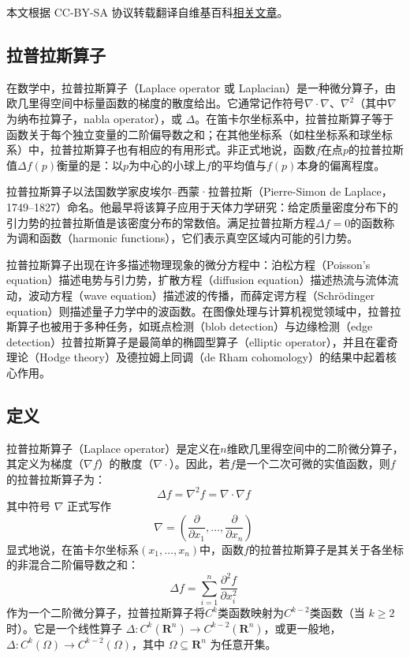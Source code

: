 
本文根据 CC-BY-SA 协议转载翻译自维基百科\href{https://en.wikipedia.org/wiki/Laplace_operator}{相关文章}。

\subsection{拉普拉斯算子}
在数学中，拉普拉斯算子（Laplace operator 或 Laplacian）是一种微分算子，由欧几里得空间中标量函数的梯度的散度给出。它通常记作符号$\nabla \cdot \nabla$、$\nabla^{2}$（其中$\nabla$为纳布拉算子，nabla operator），或 $\Delta$。在笛卡尔坐标系中，拉普拉斯算子等于函数关于每个独立变量的二阶偏导数之和；在其他坐标系（如柱坐标系和球坐标系）中，拉普拉斯算子也有相应的有用形式。非正式地说，函数$f$在点$p$的拉普拉斯值$\Delta f(p)$衡量的是：以$p$为中心的小球上$f$的平均值与$f(p)$本身的偏离程度。

拉普拉斯算子以法国数学家皮埃尔–西蒙·拉普拉斯（Pierre-Simon de Laplace，1749–1827）命名。他最早将该算子应用于天体力学研究：给定质量密度分布下的引力势的拉普拉斯值是该密度分布的常数倍。满足拉普拉斯方程$\Delta f = 0$的函数称为调和函数（harmonic functions），它们表示真空区域内可能的引力势。

拉普拉斯算子出现在许多描述物理现象的微分方程中：泊松方程（Poisson’s equation）描述电势与引力势，扩散方程（diffusion equation）描述热流与流体流动，波动方程（wave equation）描述波的传播，而薛定谔方程（Schrödinger equation）则描述量子力学中的波函数。在图像处理与计算机视觉领域中，拉普拉斯算子也被用于多种任务，如斑点检测（blob detection）与边缘检测（edge detection）拉普拉斯算子是最简单的椭圆型算子（elliptic operator），并且在霍奇理论（Hodge theory）及德拉姆上同调（de Rham cohomology）的结果中起着核心作用。
\subsection{定义}
拉普拉斯算子（Laplace operator）是定义在$n$维欧几里得空间中的二阶微分算子，其定义为梯度（$\nabla f$）的散度（$\nabla \cdot$）。因此，若$f$是一个二次可微的实值函数，则$f$的拉普拉斯算子为：
\[
\Delta f = \nabla^{2} f = \nabla \cdot \nabla f~
\]
其中符号 $\nabla$ 正式写作
\[
\nabla = \left( \frac{\partial}{\partial x_{1}}, \ldots, \frac{\partial}{\partial x_{n}} \right)~
\]
显式地说，在笛卡尔坐标系$(x_{1}, \ldots, x_{n})$中，函数$f$的拉普拉斯算子是其关于各坐标的非混合二阶偏导数之和：
\[
\Delta f = \sum_{i=1}^{n} \frac{\partial^{2} f}{\partial x_{i}^{2}}
~
\]
作为一个二阶微分算子，拉普拉斯算子将$C^{k}$类函数映射为$C^{k-2}$类函数（当 $k \ge 2$ 时）。它是一个线性算子 $\Delta : C^{k}(\mathbf{R}^{n}) \to C^{k-2}(\mathbf{R}^{n})$，或更一般地，$\Delta : C^{k}(\Omega) \to C^{k-2}(\Omega)$，其中 $\Omega \subseteq \mathbf{R}^{n}$ 为任意开集。


